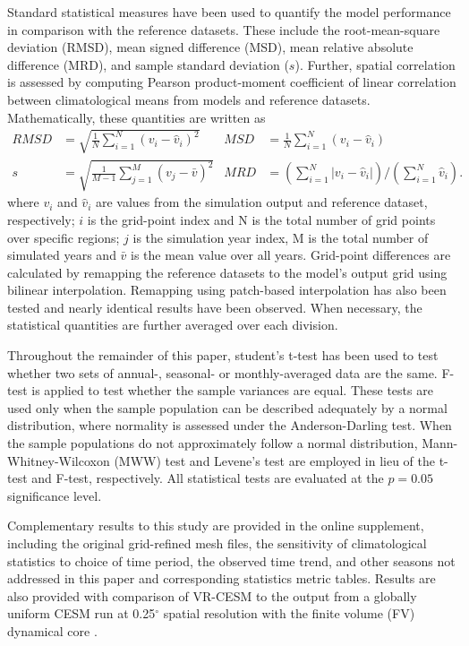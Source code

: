\documentclass[draft,ms]{agutex}   %
\begin{document}
\begin{article}
Standard statistical measures have been used to quantify the model performance in comparison with the reference datasets. These include the root-mean-square deviation (RMSD), mean signed difference (MSD), mean relative absolute difference (MRD), and sample standard deviation ($s$). Further, spatial correlation is assessed by computing Pearson product-moment coefficient of linear correlation between climatological means from models and reference datasets.  Mathematically, these quantities are written as
\begin{align}
RMSD &= \sqrt{\frac{1}{N} \sum_{i=1}^{N} (v_i - \hat{v}_i)^2}  & MSD &= \frac{1}{N} \sum_{i=1}^{N} (v_i - \hat{v}_i) \\[2.0ex]
s &= \sqrt{\frac{1}{M-1} \sum_{j=1}^{M} (v_j - \bar{v})^2}   & MRD &= \left( \sum_{i=1}^{N} |v_i - \hat{v}_i| \right) \Bigg/ \left( \sum_{i=1}^{N} \hat{v}_i \right).
\end{align} where $v_i$ and $\hat{v}_i$ are values from the simulation output and reference dataset, respectively; $i$ is the grid-point index and N is the total number of grid points over specific regions; $j$ is the simulation year index, M is the total number of simulated years and $\bar{v}$ is the mean value over all years. Grid-point differences are calculated by remapping the reference datasets to the model's output grid using bilinear interpolation.  Remapping using patch-based interpolation has also been tested and nearly identical results have been observed.  When necessary, the statistical quantities are further averaged over each division.


Throughout the remainder of this paper, student's t-test has been used to test whether two sets of annual-, seasonal- or monthly-averaged data are the same. F-test is applied to test whether the sample variances are equal. These tests are used only when the sample population can be described adequately by a normal distribution, where normality is assessed under the Anderson-Darling test. When the sample populations do not approximately follow a normal distribution, Mann-Whitney-Wilcoxon (MWW) test and Levene's test are employed in lieu of the t-test and F-test, respectively. All statistical tests are evaluated at the $p = 0.05$ significance level.

Complementary results to this study are provided in the online supplement, including the original grid-refined mesh files, the sensitivity of climatological statistics to choice of time period, the observed time trend, and other seasons not addressed in this paper and corresponding statistics metric tables. Results are also provided with comparison of VR-CESM to the output from a globally uniform CESM run at 0.25$^\circ$ spatial resolution with the finite volume (FV) dynamical core \citep{wehner2014effect}.


\end{article}
\end{document}
